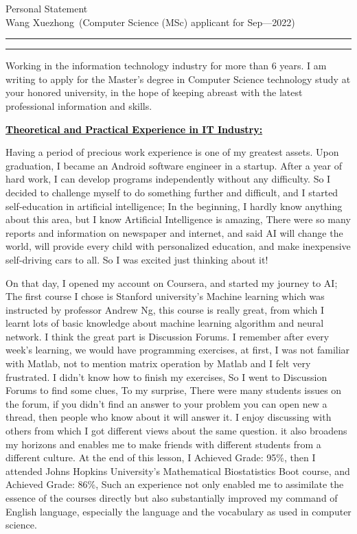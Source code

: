 \documentclass[12pt]{article}
\newcommand{\soptitle}{Personal Statement}
\newcommand{\yourname}{Wang Xuezhong}
\newcommand{\statement}[1]{\par\medskip
  \underline{\textcolor{black}{\textbf{#1:}}}\space
}
\begin{document}
\begin{center}\LARGE\soptitle\\
\large \yourname\ (Computer Science (MSc) applicant for Sep---2022)
\end{center}

\hrule
\vspace{1pt}
\hrule height 1pt


\sffamily
\mdseries



\bigskip

Working in the information technology industry for more than 6 years. I am writing to apply for the Master's degree in Computer Science technology study at your honored university, in the hope of keeping abreast with the latest professional information and skills.

\bigskip

\statement{Theoretical and Practical Experience in IT Industry}
Having a period of precious work experience is one of my greatest assets. Upon graduation, I became an Android software engineer in a startup. After a year of hard work, I can develop programs independently without any difficulty. So I decided to challenge myself to do something further and difficult, and I started self-education in artificial intelligence; In the beginning, I hardly know anything about this area, but I know Artificial Intelligence is amazing, There were so many reports and information on newspaper and internet, and said AI will change the world, will provide every child with personalized education, and make inexpensive self-driving cars to all. So I was excited just thinking about it! 

\bigskip

On that day, I opened my account on Coursera, and started my journey to AI; The first course I chose is Stanford university's Machine learning which was instructed by professor Andrew Ng, this course is really great, from which I learnt lots of basic knowledge about machine learning algorithm and neural network. I think the great part is Discussion Forums. I remember after every week's learning, we would have programming exercises, at first, I was not familiar with Matlab, not to mention matrix operation by Matlab and I felt very frustrated. I didn't know how to finish my exercises, So I went to Discussion Forums to find some clues, To my surprise, There were many students issues on the forum, if you didn't find an answer to your problem you can open new a thread, then people who know about it will answer it. I enjoy discussing with others from which I got different views about the same question. it also broadens my horizons and enables me to make friends with different students from a different culture. At the end of this lesson, I Achieved Grade: 95\%, then I attended Johns Hopkins University's Mathematical Biostatistics Boot course, and Achieved Grade: 86\%, Such an experience not only enabled me to assimilate the essence of the courses directly but also substantially improved my command of English language, especially the language and the vocabulary as used in computer science.
\end{document}
